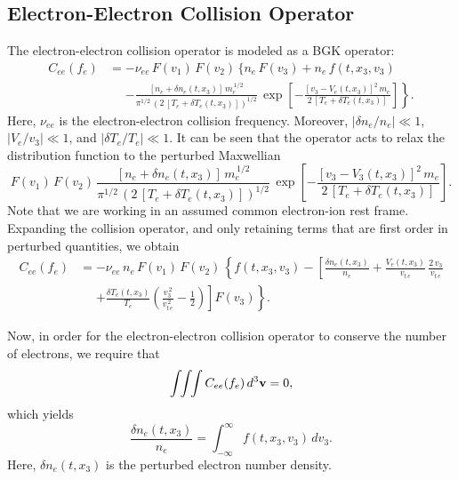\documentclass[12pt,prb,aps]{revtex4-1}
\begin{document}
\subsection{Electron-Electron Collision Operator}\label{see}
The electron-electron collision operator is modeled as a BGK operator:\,\cite{haz,krook}
\begin{align}
C_{ee}(f_e) &= -\nu_{ee}\,F(v_1)\,F(v_2)\,\biggr\{n_e\,F(v_3)+n_e\,f(t,x_3,v_3)\phantom{\frac{a}{b}}\nonumber\\[0.5ex]
&\phantom{=}\left.- \frac{[n_e+\delta n_e(t,x_3)]\,m_e^{\,1/2}}{\pi^{1/2}\,(2\,[T_e+\delta T_e(t,x_3)])^{1/2}}\,\exp\left[-\frac{[v_3-V_e(t,x_3)]^{2}\,m_e}{2\,[T_e+\delta T_e(t,x_3)]}\right]\right\}.
\end{align}
Here, $\nu_{ee}$ is the electron-electron collision frequency. Moreover, $|\delta n_e/n_e|\ll 1$, $|V_e/v_3|\ll 1$,  and $|\delta T_e/T_e|\ll 1$. It can be seen that the operator acts to relax the distribution function to the 
perturbed Maxwellian
\begin{equation}
F(v_1)\,F(v_2)\,\frac{[n_e+\delta n_e(t,x_3)]\,m_e^{\,1/2}}{\pi^{1/2}\,(2\,[T_e+\delta T_e(t,x_3)])^{1/2}}\,\exp\left[-\frac{[v_3-V_3(t,x_3)]^{2}\,m_e}{2\,[T_e+\delta T_e(t,x_3)]}\right].
\end{equation}
Note that we are working in an assumed common electron-ion rest frame.
Expanding the collision operator, and only retaining terms that are first order in perturbed quantities, we obtain
\begin{align}\label{e24}
C_{ee}(f_e) &=- \nu_{ee}\,n_e\,F(v_1)\,F(v_2)\,\left\{ f(t,x_3,v_3) - \left[\frac{\delta n_e(t,x_3)}{n_e} +\frac{V_e(t,x_3)}{v_{t\,e}} \,\frac{2\,v_3}{v_{t\,e}}\right.\right.\nonumber\\[0.5ex]
&\phantom{=}\left.\left.+\frac{\delta T_e(t,x_3)}{T_e}\left(\frac{v_3^{\,2}}{v_{t\,e}^{\,2}}-\frac{1}{2}\right)\right]F(v_3)\right\}.
\end{align}

Now, in order for the electron-electron collision operator to conserve the number of electrons, we require that
\begin{equation}
\int\!\!\int\!\!\int C_{ee}(f_e) \,d^3{\bf v} = 0,
\end{equation}
which yields
\begin{equation}\label{dne}
\frac{\delta n_e(t,x_3)}{n_e} =\int_{-\infty}^\infty f(t,x_3,v_3)\,dv_3.
\end{equation}
Here, $\delta n_e(t,x_3)$ is the perturbed electron number density. 
\end{document}
